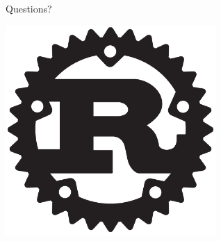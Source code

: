 \documentclass[xcolor=dvipsnames]{beamer}
\begin{document}

\begin{frame}{Questions?}
	\begin{center}
		\includegraphics[width=0.6\textwidth]{rust.png}
	\end{center}
\end{frame}
\end{document}
